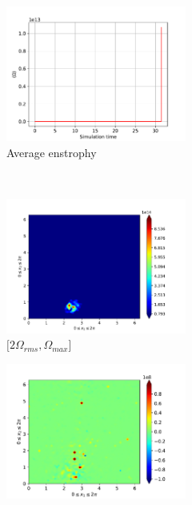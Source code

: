 \begin{figure}[H]
    \begin{subfigure}[H]{0.45\textwidth}
        \includegraphics[height=1.75in]{media/run-cds-65-5k/enst-average4750.png}
        \caption{Average enstrophy}
    \end{subfigure}
    ~
    \begin{subfigure}[H]{0.45\textwidth}
        \includegraphics[height=1.75in]{media/run-cds-65-5k/enst-2-4750.png}
        \caption{$[2\Omega_{rms}, \Omega_{max} $] }
    \end{subfigure}
    \newline
    \begin{subfigure}[H]{0.45\textwidth}
        \includegraphics[height=1.75in]{media/run-cds-65-5k/enst-4750.png}

\end{subfigure}
\end{figure}
